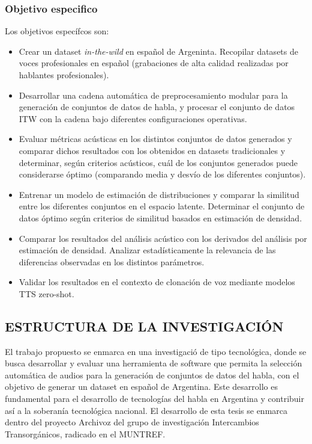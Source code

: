 \subsubsection{Objetivo especifico}

Los objetivos específcos son:

\begin{itemize}
    \item Crear un dataset \emph{in-the-wild} en español de Argeninta. Recopilar datasets de voces profesionales en español (grabaciones de alta calidad realizadas por hablantes profesionales).
    \item Desarrollar una cadena automática de preprocesamiento modular para la generación de conjuntos de datos de habla, y procesar el conjunto de datos ITW con la cadena bajo diferentes configuraciones operativas.
    \item Evaluar métricas acústicas en los distintos conjuntos de datos generados y comparar dichos resultados con los obtenidos en datasets tradicionales y determinar, según criterios acústicos, cuál de los conjuntos generados puede considerarse óptimo (comparando media y desvío de los diferentes conjuntos).
    \item Entrenar un modelo de estimación de distribuciones y comparar la similitud entre los diferentes conjuntos en el espacio latente. Determinar el conjunto de datos óptimo según criterios de similitud basados en estimación de densidad.
    \item Comparar los resultados del análisis acústico con los derivados del análisis por estimación de densidad. Analizar estadísticamente la relevancia de las diferencias observadas en los distintos parámetros.
    \item Validar los resultados en el contexto de clonación de voz mediante modelos TTS zero-shot.
\end{itemize}

\subsection{ESTRUCTURA DE LA INVESTIGACIÓN}

El trabajo propuesto se enmarca en una investigació de tipo tecnológica, donde se busca desarrollar y evaluar una herramienta de software que permita la selección automática de audios para la generación de conjuntos de datos del habla, con el objetivo de generar un dataset en español de Argentina. Este desarrollo es fundamental para el desarrollo de tecnologías del habla en Argentina y contribuir así a la soberanía tecnológica nacional. El desarrollo de esta tesis se enmarca dentro del proyecto Archivoz del grupo de investigación Intercambios Transorgánicos, radicado en el MUNTREF.

